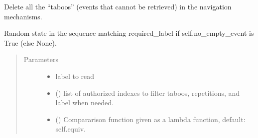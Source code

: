 \documentclass[letterpaper,10pt,english]{sphinxmanual}
\begin{document}
\begin{fulllineitems}
\begin{fulllineitems}
\end{fulllineitems}


\begin{fulllineitems}
\label{\detokenize{index:Navigator.Navigator.delete_taboos}}
Delete all the “taboos” (events that cannot be retrieved) in the navigation mechanisms.

\end{fulllineitems}


\begin{fulllineitems}
\label{\detokenize{index:Navigator.Navigator.filter_using_history_and_taboos}}
\end{fulllineitems}


\begin{fulllineitems}
\label{\detokenize{index:Navigator.Navigator.find_matching_label_without_continuation}}
Random state in the sequence matching required\_label if self.no\_empty\_event is True (else None).
\begin{quote}\begin{description}
\item[{Parameters}] \leavevmode\begin{itemize}
\item {} 
 \textendash{} label to read

\item {} 
 (\sphinxstyleliteralemphasis{(}\sphinxstyleliteralemphasis{)}) \textendash{} list of authorized indexes to filter taboos, repetitions, and label when needed.

\item {} 
 () \textendash{} Compararison function given as a lambda function, default: self.equiv.


\end{itemize}
\end{description}
\end{quote}
\end{fulllineitems}
\end{fulllineitems}
\end{document}
